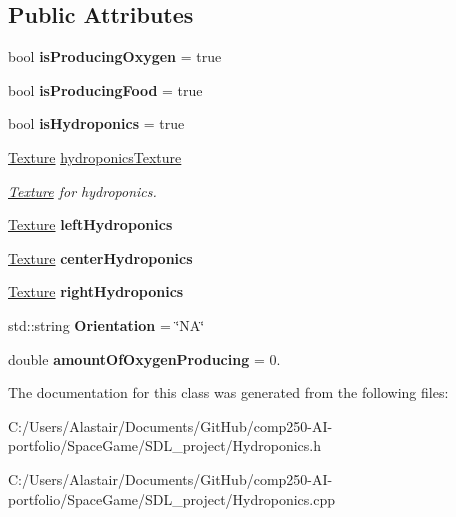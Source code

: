 \subsection*{Public Attributes}
\begin{DoxyCompactItemize}
\item 
\mbox{\label{class_hydroponics_af94045fbbcb208b332d95bb712135056}} 
bool {\bfseries is\+Producing\+Oxygen} = true
\item 
\mbox{\label{class_hydroponics_ab33b17ae6e1f74fb62093f99632338fc}} 
bool {\bfseries is\+Producing\+Food} = true
\item 
\mbox{\label{class_hydroponics_a8cd445b84d3227cb39a2f5255d3002e6}} 
bool {\bfseries is\+Hydroponics} = true
\item 
\mbox{\label{class_hydroponics_a5496629c4a016c3ad9d35f3fcb7715d8}} 
\hyperlink{class_texture}{Texture} \hyperlink{class_hydroponics_a5496629c4a016c3ad9d35f3fcb7715d8}{hydroponics\+Texture}
\begin{DoxyCompactList}\small\item\em \hyperlink{class_texture}{Texture} for hydroponics. \end{DoxyCompactList}\item 
\mbox{\label{class_hydroponics_aa865e914472935719c7cb9f559478100}} 
\hyperlink{class_texture}{Texture} {\bfseries left\+Hydroponics}
\item 
\mbox{\label{class_hydroponics_a511bf34c1b907164d61394b6ab8dd32a}} 
\hyperlink{class_texture}{Texture} {\bfseries center\+Hydroponics}
\item 
\mbox{\label{class_hydroponics_a8ad23d4cdc2f8e9188295143210a963f}} 
\hyperlink{class_texture}{Texture} {\bfseries right\+Hydroponics}
\item 
\mbox{\label{class_hydroponics_ac21b247254d6b4af3746ea38e54100c9}} 
std\+::string {\bfseries Orientation} = \char`\"{}NA\char`\"{}
\item 
\mbox{\label{class_hydroponics_aea1f52620240261ad02b156051d31694}} 
double {\bfseries amount\+Of\+Oxygen\+Producing} = 0.
\end{DoxyCompactItemize}


The documentation for this class was generated from the following files\+:\begin{DoxyCompactItemize}
\item 
C\+:/\+Users/\+Alastair/\+Documents/\+Git\+Hub/comp250-\/\+A\+I-\/portfolio/\+Space\+Game/\+S\+D\+L\+\_\+project/Hydroponics.\+h\item 
C\+:/\+Users/\+Alastair/\+Documents/\+Git\+Hub/comp250-\/\+A\+I-\/portfolio/\+Space\+Game/\+S\+D\+L\+\_\+project/Hydroponics.\+cpp\end{DoxyCompactItemize}
